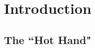 \documentclass[letterpaper,12pt]{article}\usepackage[]{graphicx}\usepackage[]{color}
\begin{document}


\section{Introduction}
\subsection{The ``Hot Hand"}
\end{document}
